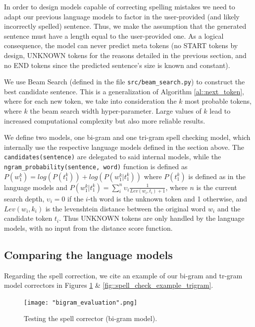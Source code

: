 \documentclass[11pt, a4paper]{article}
\begin{document}
	In order to design models capable of correcting spelling mistakes we need to adapt our previous language models to factor in the user-provided (and likely incorrectly spelled) sentence. Thus, we make the assumption that the generated sentence must have a length equal to the user-provided one. As a logical consequence, the model can never predict meta tokens (no START tokens by design, UNKNOWN tokens for the reasons detailed in the previous section, and no END tokens since the predicted sentence's size is known and constant).
	
	We use Beam Search (defined in the file \texttt{src/beam\_search.py}) to construct the best candidate sentence. This is a generalization of Algorithm \ref{al::next_token}, where for each new token, we take into consideration the $k$ most probable tokens, where $k$ the beam search width hyper-parameter. Large values of $k$ lead to increased computational complexity but also more reliable results.
	
	We define two models, one bi-gram and one tri-gram spell checking model, which internally use the respective language models defined in the section above. The \texttt{candidates(sentence)} are delegated to said internal models, while the \texttt{ngram\_probability(sentence, word)} function is defined as $P(w^{k}_1) =log(P(t^k_1)) + log(P(w^{k}_1 | t^k_1))$ where $P(t^k_1)$ is defined as in the language models and $ P(w^{k}_1 | t^k_1) = \sum^n_i \upsilon_i \frac{1}{Lev(w_i, t_i) + 1}$, where $n$ is the current search depth, $\upsilon_i = 0$ if the $i$-th word is the unknown token and 1 otherwise, and $Lev(w_i, k_i)$ is the levenshtein distance between the original word $w_i$ and the candidate token $t_i$. Thus UNKNOWN tokens are only handled by the language models, with no input from the distance score function.

	
	\subsection{Comparing the language models}
	
	Regarding the spell correction, we cite an example of our bi-gram and tr-gram model correctors in Figures \ref{fig::spell_check_example_bigram} \& \ref{fig::spell_check_example_trigram}.
	
	 \begin{figure}
	    \centering
	    \texttt{[image: "bigram\_evaluation".png]}
	    \caption{Testing the spell corrector (bi-gram model).}
	    \label{fig::spell_check_example_bigram}
	\end{figure}
\end{document}
